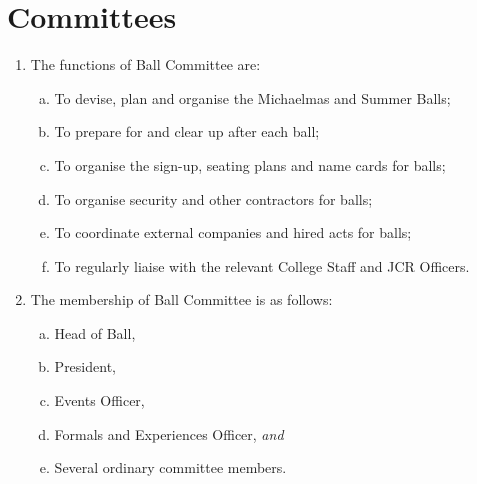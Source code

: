 \documentclass[12pt]{article}
\begin{document}
\section{Committees}
\begin{enumerate}
    \subsection{Ball Committee}
    \item The functions of Ball Committee are:
    \begin{enumerate}[(a)]
        \item To devise, plan and organise the Michaelmas and Summer Balls;
        \item To prepare for and clear up after each ball;
        \item To organise the sign-up, seating plans and name cards for balls;
        \item To organise security and other contractors for balls;
        \item To coordinate external companies and hired acts for balls;
        \item To regularly liaise with the relevant College Staff and JCR Officers.
    \end{enumerate}
    \item The membership of Ball Committee is as follows:
    \begin{enumerate}[(a)]
        \item Head of Ball,
        \item President,
        \item Events Officer,
        \item Formals and Experiences Officer, \emph{and}
        \item Several ordinary committee members.
    \end{enumerate}


\end{enumerate}
\end{document}

